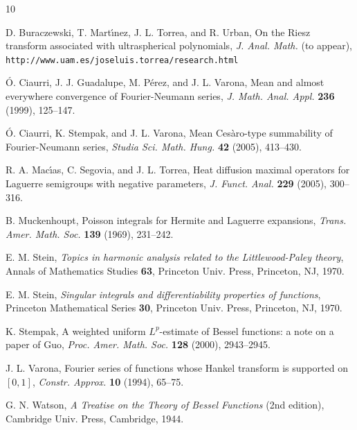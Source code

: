 \documentclass[11pt,a4paper]{amsart}
\theoremstyle{plain}
\theoremstyle{remark}
\begin{document}
\begin{thebibliography}{10}

 D. Buraczewski, T. Mart\'{\i}nez, J. L. Torrea, and R. Urban,
{On the Riesz transform associated with ultraspherical polynomials},
\textit{J. Anal. Math.} (to appear),
\texttt{http://www.uam.es/joseluis.torrea/research.html}

 \'O. Ciaurri, J. J. Guadalupe, M. P\'erez, and J. L. Varona,
{Mean and almost everywhere convergence of Fourier-Neumann series},
\textit{J. Math. Anal. Appl.}
\textbf{236} (1999), 125--147.

 \'O. Ciaurri, K. Stempak, and J. L. Varona,
Mean Ces\`aro-type summability of Fourier-Neumann series,
\textit{Studia Sci. Math. Hung.}
\textbf{42} (2005), 413--430.

 R. A. Mac\'{\i}as, C. Segovia, and J. L. Torrea,
{Heat diffusion maximal operators for Laguerre semigroups with negative parameters},
\textit{J. Funct. Anal.}
\textbf{229} (2005), 300--316.

 B. Muckenhoupt,
{Poisson integrals for Hermite and Laguerre expansions},
\textit{Trans. Amer. Math. Soc.}
\textbf{139} (1969), 231--242.

 E. M. Stein,
\textit{Topics in harmonic analysis related to the Littlewood-Paley theory},
{Annals of Mathematics Studies} \textbf{63},
Princeton Univ. Press,
Princeton, NJ, 1970.

 E. M. Stein,
\textit{Singular integrals and differentiability properties of functions},
Princeton Mathematical Series \textbf{30},
Princeton Univ. Press,
Princeton, NJ, 1970.

 K. Stempak,
{A weighted uniform $L^p$-estimate of Bessel functions: a note on a paper of Guo},
\textit{Proc. Amer. Math. Soc.}
\textbf{128} (2000), 2943--2945.

 J. L. Varona,
{Fourier series of functions whose Hankel transform is supported on $[0,1]$},
\textit{Constr. Approx.}
\textbf{10} (1994), 65--75.

 G. N. Watson,
\textit{A Treatise on the Theory of Bessel Functions} (2nd edition),
Cambridge Univ. Press,
Cambridge, 1944.

\end{thebibliography}
\end{document}
